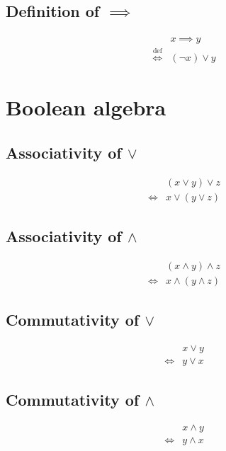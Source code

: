 \subsection{Definition of $\implies$}
\begin{defn}
\label{Definition:implies}
\begin{align*}
& x \implies y \\
\overset{\operatorname{def}}{\iff} & (\lnot x) \lor y
\end{align*}
\end{defn}

\section{Boolean algebra}
\subsection{Associativity of $\lor$}
\begin{prop}
\label{Proposition:lor_associativity}
\begin{align*}
& (x \lor y) \lor z \\
\iff & x \lor (y \lor z)
\end{align*}
\end{prop}

\subsection{Associativity of $\land$}
\begin{prop}
\label{Proposition:land_associativity}
\begin{align*}
& (x \land y) \land z \\
\iff & x \land (y \land z)
\end{align*}
\end{prop}

\subsection{Commutativity of $\lor$}
\begin{prop}
\label{Proposition:lor_commutativity}
\begin{align*}
& x \lor y \\
\iff & y \lor x
\end{align*}
\end{prop}

\subsection{Commutativity of $\land$}
\begin{prop}
\label{Proposition:land_commutativity}
\begin{align*}
& x \land y \\
\iff & y \land x
\end{align*}
\end{prop}

